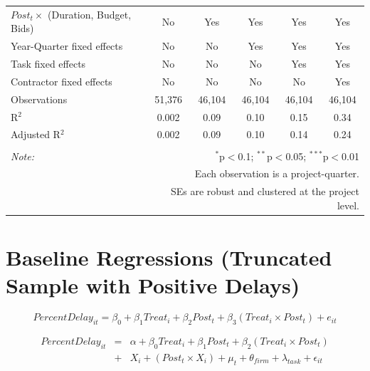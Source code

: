 \documentclass[
]{article}
\begin{document}
\begin{table}[H]
\begin{tabular}{@{\extracolsep{-2pt}}lccccc}
$Post_t \times$  (Duration, Budget, Bids) & No & Yes & Yes & Yes & Yes \\ 
Year-Quarter fixed effects & No & No & Yes & Yes & Yes \\ 
Task fixed effects & No & No & No & Yes & Yes \\ 
Contractor fixed effects & No & No & No & No & Yes \\ 
Observations & 51,376 & 46,104 & 46,104 & 46,104 & 46,104 \\ 
R$^{2}$ & 0.002 & 0.09 & 0.10 & 0.15 & 0.34 \\ 
Adjusted R$^{2}$ & 0.002 & 0.09 & 0.10 & 0.14 & 0.24 \\ 
\hline 
\hline \\[-1.8ex] 
\textit{Note:}  & \multicolumn{5}{r}{$^{*}$p$<$0.1; $^{**}$p$<$0.05; $^{***}$p$<$0.01} \\ 
 & \multicolumn{5}{r}{Each observation is a project-quarter.} \\ 
 & \multicolumn{5}{r}{SEs are robust and clustered at the project level.} \\ 
\end{tabular} 
\end{table}

\hypertarget{baseline-regressions-truncated-sample-with-positive-delays}{%
\section{Baseline Regressions (Truncated Sample with Positive
Delays)}\label{baseline-regressions-truncated-sample-with-positive-delays}}

\[ PercentDelay_{it} = \beta_0 + \beta_1 Treat_i + \beta_2 Post_t + \beta_3 (Treat_i \times Post_t) + e_{it}\]

\[ \begin{aligned} PercentDelay_{it} &=& \alpha+\beta_0 Treat_i + \beta_1 Post_t + \beta_2 (Treat_i \times Post_t)\\
&+&  X_i + (Post_t \times X_i) + \mu_t + \theta_{firm} + \lambda_{task}+ \epsilon_{it}
\end{aligned}\]
\end{document}
